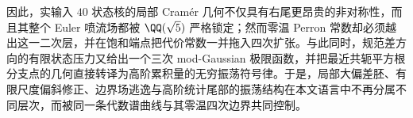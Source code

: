 \noindent
因此，实输入 \(40\) 状态核的局部 Cram\'er 几何不仅具有右尾更昂贵的非对称性，而且其整个 Euler 喷流场都被 \(\QQ(\sqrt5)\) 严格锁定；然而零温 Perron 常数却必须越出这一二次层，并在饱和端点把代价常数一并拖入四次扩张。与此同时，规范差方向的有限状态压力又给出一个三次 mod-Gaussian 极限函数，并把最近共轭平方根分支点的几何直接转译为高阶累积量的无穷振荡符号律。于是，局部大偏差胚、有限尺度偏斜修正、边界场逃逸与高阶统计尾部的振荡结构在本文语言中不再分属不同层次，而被同一条代数谱曲线与其零温四次边界共同控制。

\endinput
